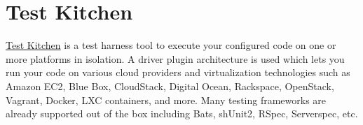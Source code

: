 \section{Test Kitchen}
\label{sec:testing-test-kitchen}

\href{http://kitchen.ci/}{Test Kitchen} is a test harness tool to execute your configured code on one or more platforms in isolation. A driver plugin architecture is used which lets you run your code on various cloud providers and virtualization technologies such as Amazon EC2, Blue Box, CloudStack, Digital Ocean, Rackspace, OpenStack, Vagrant, Docker, LXC containers, and more. Many testing frameworks are already supported out of the box including Bats, shUnit2, RSpec, Serverspec, etc.








